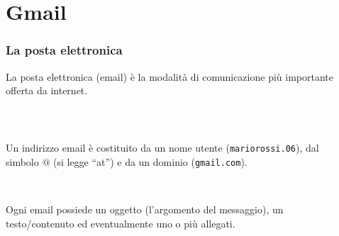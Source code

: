 \documentclass[handout]{beamer}
\begin{document}
\section{Gmail}


\begin{frame}
\frametitle{La posta elettronica}
La posta elettronica (\alert<1>{email}) è la modalità di comunicazione più importante offerta da internet.\pause

~

\begin{columns}
  \begin{column}{0.55\textwidth}
  Un indirizzo email è costituito da un nome utente (\texttt{mariorossi.06}), dal simbolo $@$ (si legge ``at'') e da un dominio (\texttt{gmail.com}).\pause

   ~
   
   Ogni email possiede un \alert<3>{oggetto} (l'argomento del messaggio), un \alert<3>{testo/contenuto} ed eventualmente uno o più \alert<3>{allegati}.
  \end{column}
  \begin{column}{0.37\textwidth}
  \end{column}
\end{columns}
\end{frame}
\end{document}

